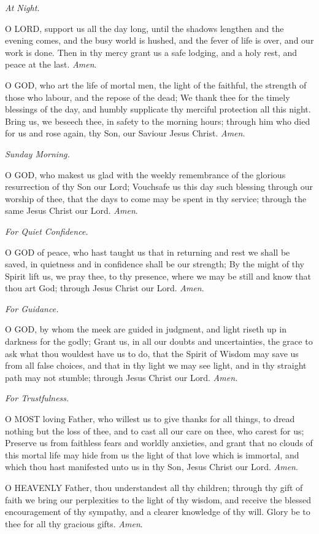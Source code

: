 \emph{At
Night.}

O
LORD, support us all the day long, until the shadows lengthen and the
evening comes, and the busy world is hushed, and the fever of life is
over, and our work is done. Then in thy mercy grant us a safe lodging,
and a holy rest, and peace at the last. \emph{Amen}.

O
GOD, who art the life of mortal men, the light of the faithful, the strength
of those who labour, and the repose of the dead; We thank thee for the
timely blessings of the day, and humbly supplicate thy merciful protection
all this night. Bring us, we beseech thee, in safety to the morning hours;
through him who died for us and rose again, thy Son, our Saviour Jesus
Christ. \emph{Amen}.

\emph{Sunday
Morning.}

O
GOD, who makest us glad with the weekly remembrance of the glorious resurrection
of thy Son our Lord; Vouchsafe us this day such blessing through our worship
of thee, that the days to come may be spent in thy service; through the
same Jesus Christ our Lord. \emph{Amen}.

\emph{For
Quiet Confidence.}

O
GOD of peace, who hast taught us that in returning and rest we shall be
saved, in quietness and in confidence shall be our strength; By the might
of thy Spirit lift us, we pray thee, to thy presence, where we may be
still and know that thou art God; through Jesus Christ our Lord. \emph{Amen}.

\emph{For
Guidance.}

O
GOD, by whom the meek are guided in judgment, and light riseth up in darkness
for the godly; Grant us, in all our doubts and uncertainties, the grace
to ask what thou wouldest have us to do, that the Spirit of Wisdom may
save us from all false choices, and that in thy light we may see light,
and in thy straight path may not stumble; through Jesus Christ our Lord.
\emph{Amen.}

\emph{For
Trustfulness.}

O
MOST loving Father, who willest us to give thanks for all things, to
dread nothing but the loss of thee, and to cast all our care on thee,
who carest for us; Preserve us from faithless fears and worldly anxieties,
and grant that no clouds of this mortal life may hide from us the light
of that love which is immortal, and which thou hast manifested unto
us in thy Son, Jesus Christ our Lord. \emph{Amen}.

O
HEAVENLY Father, thou understandest all thy children; through thy gift
of faith we bring our perplexities to the light of thy wisdom, and receive
the blessed encouragement of thy sympathy, and a clearer knowledge of
thy will. Glory be to thee for all thy gracious gifts. \emph{Amen}.

